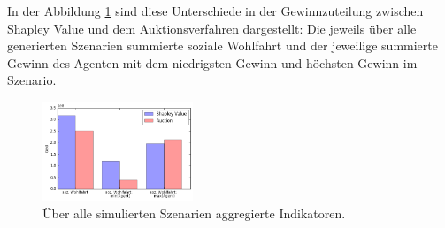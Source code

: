 In der Abbildung \ref{results} sind diese Unterschiede in der Gewinnzuteilung zwischen Shapley Value und dem Auktionsverfahren dargestellt: Die jeweils über alle generierten Szenarien summierte soziale Wohlfahrt und der jeweilige summierte Gewinn des Agenten mit dem niedrigsten Gewinn und höchsten Gewinn im Szenario.

\begin{figure}
  \centering
  \includegraphics[width=0.4\textwidth]{results.png}
  \caption{Über alle simulierten Szenarien aggregierte Indikatoren.}
  \label{results}
\end{figure} 

